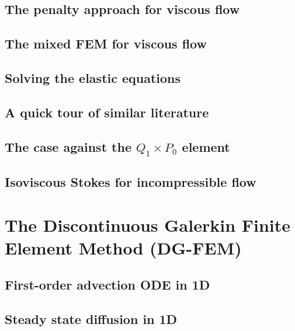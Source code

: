 \documentclass[a4paper]{article}
\begin{document}
\subsection{The penalty approach for viscous flow}\label{sec:penalty} %
\subsection{The mixed FEM for viscous flow} \label{sec:mixed}  %
\subsection{Solving the elastic equations} %
\subsection{A quick tour of similar literature}  %
\subsection{The case against the $Q_1\times P_0$ element}  %
\subsection{Isoviscous Stokes for incompressible flow}  %

\newpage
\section{The Discontinuous Galerkin Finite Element Method (DG-FEM) \label{dgfem}} %



\subsection{First-order advection ODE in 1D} 
\subsection{Steady state diffusion in 1D \label{ss:dgss1D}} 
\end{document}
